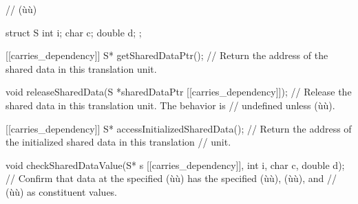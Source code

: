 %
%
\begin{emcppslisting}
// (ù{}ù)                                                          
                                                                                
struct S                                                                        
{                                                                               
    int    i;                                                                   
    char   c;                                                                   
    double d;                                                                   
};                                                                              
                                                                                
[[carries_dependency]] S* getSharedDataPtr();                                   
    // Return the address of the shared data in this translation unit.          
                                                                                
void releaseSharedData(S *sharedDataPtr [[carries_dependency]]);                
    // Release the shared data in this translation unit.  The behavior is       
    // undefined unless (ù{}ù).                  
                                                                                
[[carries_dependency]] S* accessInitializedSharedData();                        
    // Return the address of the initialized shared data in this translation    
    // unit.                                                                    
                                                                                
void checkSharedDataValue(S* s [[carries_dependency]],                          
                          int    i,                                             
                          char   c,                                             
                          double d);                                            
    // Confirm that data at the specified (ù{}ù) has the specified (ù{}ù), (ù{}ù), and   
    // (ù{}ù) as constituent values.
\end{emcppslisting}
